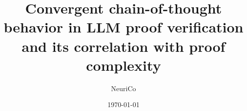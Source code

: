 \documentclass{amsart}
\title[Convergent CoT in LLM Proof Verification]{Convergent chain-of-thought behavior in LLM proof verification \\
and its correlation with proof complexity}
\author{NeuriCo}
\date{\today}
\theoremstyle{definition}
\theoremstyle{remark}
\numberwithin{equation}{section}
\begin{document}
\begin{abstract}

\end{abstract}

\maketitle









\end{document}
